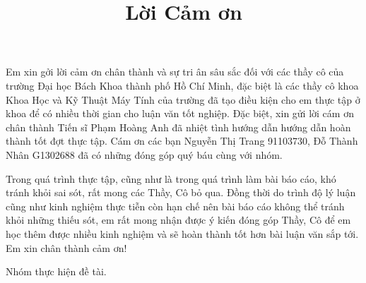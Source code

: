 
\begin{acknowledgements}
\title{Lời Cảm ơn}      

	Em xin gởi lời cảm ơn chân thành và sự tri ân sâu sắc đối với các thầy cô của trường Đại học Bách Khoa thành phố Hồ Chí Minh, đặc biệt là các thầy cô khoa Khoa Học và Kỹ Thuật Máy Tính của trường đã tạo điều kiện cho em thực tập ở khoa để có nhiều thời gian cho luận văn tốt nghiệp. Đặc biệt, xin gửi lời cám ơn chân thành Tiến sĩ Phạm Hoàng Anh đã nhiệt tình hướng dẫn hướng dẫn hoàn thành tốt đợt thực tập. Cám ơn các bạn Nguyễn Thị Trang 91103730, Đỗ Thành Nhân G1302688 đã có những đóng góp quý báu cùng với nhóm.

Trong quá trình thực tập, cũng như là trong quá trình làm bài báo cáo, khó tránh khỏi sai sót, rất mong các Thầy, Cô bỏ qua. Đồng thời do trình độ lý luận cũng như kinh nghiệm thực tiễn còn hạn chế nên bài báo cáo không thể tránh khỏi những thiếu sót, em rất mong nhận được ý kiến đóng góp Thầy, Cô để em học thêm được nhiều kinh nghiệm và sẽ hoàn thành tốt hơn bài luận văn sắp tới.
Em xin chân thành cảm ơn!

\begin{flushright}
Nhóm thực hiện đề tài.
\end{flushright} 



\end{acknowledgements}

